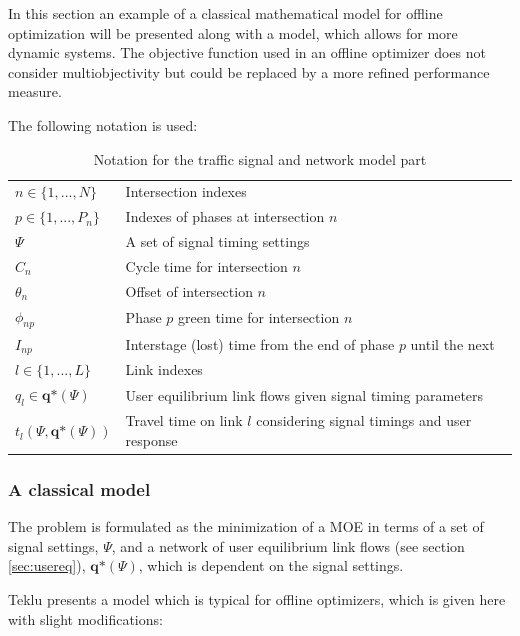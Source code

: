 \label{sec:model}

In this section an example of a classical mathematical model for
offline optimization will be presented along with a model, which
allows for more dynamic systems. The objective function used in an
offline optimizer does not consider multiobjectivity but could be
replaced by a more refined performance measure.

The following notation is used:

\begin{table}[!ht]
\begin{center}
\begin{tabular}{ll}
\hline
$n \in \lbrace 1,...,N \rbrace$ & Intersection indexes \\
$p \in \lbrace 1,...,P_n \rbrace$ & Indexes of phases at intersection $n$ \\ 
$\Psi$ & A set of signal timing settings \\
$C_n$ & Cycle time for intersection $n$ \\
$\theta_n$ & Offset of intersection $n$ \\
$\phi_{np}$ & Phase $p$ green time for intersection $n$  \\
$I_{np}$ & Interstage (lost) time from the end of phase $p$ until the next  \\
\hline
$l \in \lbrace 1,...,L \rbrace$ & Link indexes \\
$q_l \in \textbf{q*}(\Psi)$ & User equilibrium link flows given signal timing parameters  \\
$t_l(\Psi,\textbf{q*}(\Psi))$ & Travel time on link $l$ considering signal timings and user response \\
\hline
\end{tabular}
\end{center}
\caption{Notation for the traffic signal and network model part}
\end{table}

\subsubsection*{A classical model}

The problem is formulated as the minimization of a MOE in terms of a
set of signal settings, $\Psi$, and a network of user equilibrium link
flows (see section \ref{sec:usereq}), $\textbf{q*}(\Psi)$, which is
dependent on the signal settings.

Teklu \cite{2} presents a model which is typical for offline optimizers, which is given here with slight modifications:

